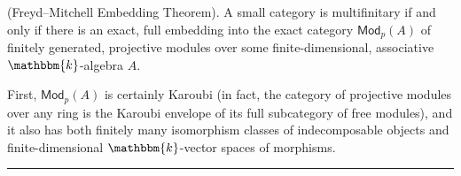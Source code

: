 \noindent\begin{theorem}\textup{(Freyd--Mitchell Embedding Theorem).}\label{FreydMitchell} A small category is multifinitary if and only if there is an exact, full embedding into the exact category $\mathsf{Mod}_p(A)$ of finitely generated, projective modules over some finite-dimensional, associative $\mathbbm{k}$-algebra $A$.\\
\end{theorem}

\noindent\begin{sketch} First, $\mathsf{Mod}_p(A)$ is certainly Karoubi (in fact, the category of projective modules over any ring is the Karoubi envelope of its full subcategory of free modules), and it also has both finitely many isomorphism classes of indecomposable objects and finite-dimensional $\mathbbm{k}$-vector spaces of morphisms.\\[-1.5\baselineskip]%
\begin{center}
\rule{0.5\linewidth}{1pt}
\end{center}
\noindent\\[-\baselineskip]

\end{sketch}
